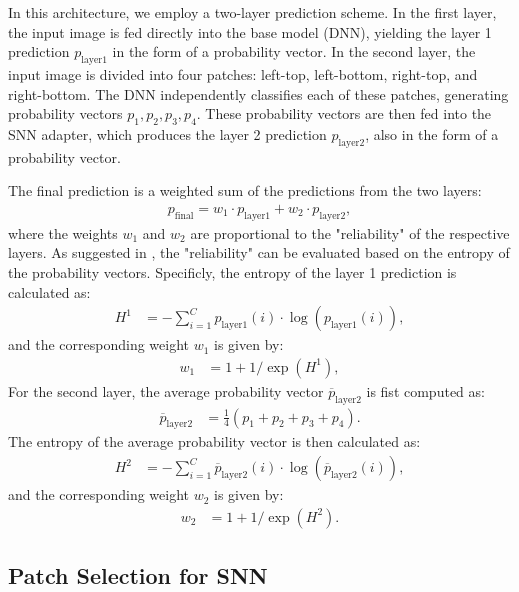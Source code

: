 In this architecture, we employ a two-layer prediction scheme. In the first layer, the input image is fed directly into the base model (DNN), yielding the layer 1 prediction $p_{\text{layer1}}$ 
in the form of a probability vector. In the second layer, the input image is divided into four patches: left-top, left-bottom, right-top, and right-bottom. The DNN independently classifies each of these patches, generating probability vectors $p_1,p_2,p_3,p_4$. These probability vectors are then fed into the SNN adapter, which produces the layer 2 prediction 
$p_{\text{layer2}}$, also in the form of a probability vector.

The final prediction is a weighted sum of the predictions from the two layers:
\begin{align}
    p_{\text{final}} = w_1\cdot p_{\text{layer1}} + w_2\cdot p_{\text{layer2}},
\end{align}
where the weights $w_1$ and $w_2$ are proportional to the "reliability" of the respective layers. 
As suggested in \cite{hua2020artist}, the "reliability" can be evaluated based on the entropy of the probability vectors. Specificly, 
the entropy of the layer 1 prediction is calculated as:
\begin{align}
    H^1 &= -\sum_{i=1}^{C} p_{\text{layer1}}(i) \cdot \log(p_{\text{layer1}}(i)),
\end{align}
and the corresponding weight $w_1$ is given by:
\begin{align}
    w_1 &= 1 + 1/\exp(H^1),
\end{align}
For the second layer, the average probability vector $\overline{p}_{\text{layer2}}$ is fist computed as:
\begin{align}
    \overline{p}_{\text{layer2}}&=\frac{1}{4}(p_1 + p_2 + p_3 + p_4).
\end{align}
The entropy of the average probability vector is then calculated as:
\begin{align}
    H^2 &= -\sum_{i=1}^{C} \overline{p}_{\text{layer2}}(i) \cdot \log(\overline{p}_{\text{layer2}}(i)),
\end{align}
and the corresponding weight $w_2$ is given by:
\begin{align}
    w_2 &= 1 + 1/\exp(H^2).
\end{align}

\subsection{Patch Selection for SNN}
